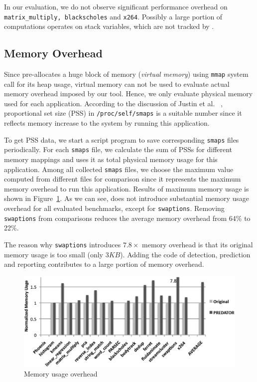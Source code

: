 In our evaluation, we do not observe significant performance overhead on 
\texttt{matrix\_multiply, blackscholes} and 
\texttt{x264}.
Possibly a large portion of computations operates on stack variables, which are
not tracked by \Predator{}. 

\subsection{Memory Overhead}
\label{sec:memoverhead}
Since \Predator{} pre-allocates a huge block of memory ({\it virtual memory}) 
using \texttt{mmap} system call for its heap usage, 
virtual memory can not be used to evaluate actual memory overhead imposed by our tool. 
Hence, we only evaluate physical memory used for each application. 
According to the discussion of Justin et al. ~\cite{memusage}, proportional set size (PSS) 
in \texttt{/proc/self/smaps} is a suitable number since it reflects memory increase to the system
by running this application. 

To get PSS data, we start a script program to save 
corresponding \texttt{smaps} files periodically.
For each \texttt{smaps} file, we calculate the sum of PSSs for different
memory mappings and uses it as total physical memory usage for this application.
Among all collected \texttt{smaps} files, we choose the maximum value computed from
different files for comparison 
since it represents the maximum memory overhead to run this application.
Results of maximum memory usage is shown in Figure~\ref{fig:memusage}. As we can see,
\Predator{} does not introduce substantial memory usage overhead 
for all evaluated benchmarks, except for \texttt{swaptions}. 
Removing \texttt{swaptions} from comparisons reduces 
the average memory overhead from 64\% to 22\%. 

The reason why \texttt{swaptions} introduces $7.8\times$ memory overhead is that 
its original memory usage is too small (only $3KB$).
Adding the code of detection, prediction and
reporting contributes to a large portion of memory overhead. 

\begin{figure}
\begin{center} 
\includegraphics[width=6.5in]{fig/memusage}
\end{center}
\caption{Memory usage overhead}
\label{fig:memusage}
\end{figure}



